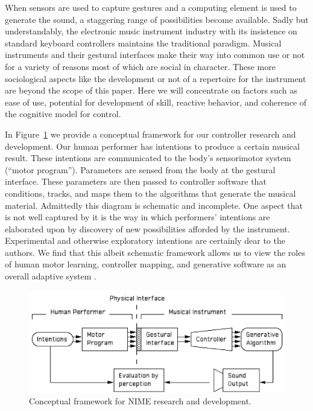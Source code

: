 When sensors are used to capture gestures and a computing element is used to generate the sound, a staggering range of possibilities become available. Sadly but understandably, the electronic music instrument industry with its insistence on standard keyboard controllers maintains the traditional paradigm. Musical instruments and their gestural interfaces make their way into common use or not for a variety of reasons most of which are social in character. These more sociological aspects like the development or not of a repertoire for the instrument are beyond the scope of this paper. Here we will concentrate on factors such as ease of use, potential for development of skill, reactive behavior, and coherence of the cognitive model for control.

In Figure~\ref{Wessel:img-2} we provide a conceptual framework for our controller research and development. Our human performer has intentions to produce a certain musical result. These intentions are communicated to the body's sensorimotor system (``motor program''). Parameters are sensed from the body at the gestural interface. These parameters are then passed to controller software that conditions, tracks, and maps them to the algorithms that generate the musical material. Admittedly this diagram is schematic and incomplete. One aspect that is not well captured by it is the way in which performers' intentions are elaborated upon by discovery of new possibilities afforded by the instrument. Experimental and otherwise exploratory intentions are certainly dear to the authors. We find that this albeit schematic framework allows us to view the roles of human motor learning, controller mapping, and generative software as an overall adaptive system \cite{Lee:1992}.

\begin{figure}[t]
\centering
\includegraphics[width=\textwidth]{wessel_fig1.png}
\caption{Conceptual framework for NIME research and development.}
\label{Wessel:img-2}
\end{figure}


